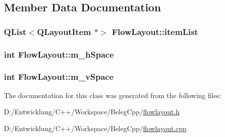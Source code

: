 \subsection{Member Data Documentation}
\hypertarget{class_flow_layout_ac0439e82402e53445451edfece8a499d}{
\subsubsection[{item\+List}]{\setlength{\rightskip}{0pt plus 5cm}Q\+List$<$Q\+Layout\+Item $\ast$$>$ Flow\+Layout\+::item\+List\hspace{0.3cm}{\ttfamily [private]}}}\label{class_flow_layout_ac0439e82402e53445451edfece8a499d}
\hypertarget{class_flow_layout_a4ca5e85c50060f2cf19d88d1e3bf9cd5}{
\subsubsection[{m\+\_\+h\+Space}]{\setlength{\rightskip}{0pt plus 5cm}int Flow\+Layout\+::m\+\_\+h\+Space\hspace{0.3cm}{\ttfamily [private]}}}\label{class_flow_layout_a4ca5e85c50060f2cf19d88d1e3bf9cd5}
\hypertarget{class_flow_layout_ab24b23dbcc261472940b3755ba63a4c0}{
\subsubsection[{m\+\_\+v\+Space}]{\setlength{\rightskip}{0pt plus 5cm}int Flow\+Layout\+::m\+\_\+v\+Space\hspace{0.3cm}{\ttfamily [private]}}}\label{class_flow_layout_ab24b23dbcc261472940b3755ba63a4c0}


The documentation for this class was generated from the following files\+:\begin{DoxyCompactItemize}
\item 
D\+:/\+Entwicklung/\+C++/\+Workspace/\+Beleg\+Cpp/\hyperlink{flowlayout_8h}{flowlayout.\+h}\item 
D\+:/\+Entwicklung/\+C++/\+Workspace/\+Beleg\+Cpp/\hyperlink{flowlayout_8cpp}{flowlayout.\+cpp}\end{DoxyCompactItemize}
